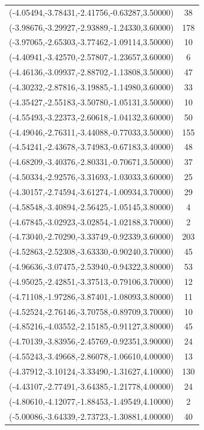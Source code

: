 \documentclass[12pt, fullpage,letterpaper]{article}
\begin{document}
\begin{longtable}{c|c}
(-4.05494,-3.78431,-2.41756,-0.63287,3.50000) & 38 \\
(-3.98676,-3.29927,-2.93889,-1.24330,3.60000) & 178 \\
(-3.97065,-2.65303,-3.77462,-1.09114,3.50000) & 10 \\
(-4.40941,-3.42570,-2.57807,-1.23657,3.60000) & 6 \\
(-4.46136,-3.09937,-2.88702,-1.13808,3.50000) & 47 \\
(-4.30232,-2.87816,-3.19885,-1.14980,3.60000) & 33 \\
(-4.35427,-2.55183,-3.50780,-1.05131,3.50000) & 10 \\
(-4.55493,-3.22373,-2.60618,-1.04132,3.60000) & 50 \\
(-4.49046,-2.76311,-3.44088,-0.77033,3.50000) & 155 \\
(-4.54241,-2.43678,-3.74983,-0.67183,3.40000) & 48 \\
(-4.68209,-3.40376,-2.80331,-0.70671,3.50000) & 37 \\
(-4.50334,-2.92576,-3.31693,-1.03033,3.60000) & 25 \\
(-4.30157,-2.74594,-3.61274,-1.00934,3.70000) & 29 \\
(-4.58548,-3.40894,-2.56425,-1.05145,3.80000) & 4 \\
(-4.67845,-3.02923,-3.02854,-1.02188,3.70000) & 2 \\
(-4.73040,-2.70290,-3.33749,-0.92339,3.60000) & 203 \\
(-4.52863,-2.52308,-3.63330,-0.90240,3.70000) & 45 \\
(-4.96636,-3.07475,-2.53940,-0.94322,3.80000) & 53 \\
(-4.95025,-2.42851,-3.37513,-0.79106,3.70000) & 12 \\
(-4.71108,-1.97286,-3.87401,-1.08093,3.80000) & 11 \\
(-4.52524,-2.76146,-3.70758,-0.89709,3.70000) & 10 \\
(-4.85216,-4.03552,-2.15185,-0.91127,3.80000) & 45 \\
(-4.70139,-3.83956,-2.45769,-0.92351,3.90000) & 24 \\
(-4.55243,-3.49668,-2.86078,-1.06610,4.00000) & 13 \\
(-4.37912,-3.10124,-3.33490,-1.31627,4.10000) & 130 \\
(-4.43107,-2.77491,-3.64385,-1.21778,4.00000) & 24 \\
(-4.80610,-4.12077,-1.88453,-1.49549,4.10000) & 2 \\
(-5.00086,-3.64339,-2.73723,-1.30881,4.00000) & 40 \\

\end{longtable}
\end{document}
